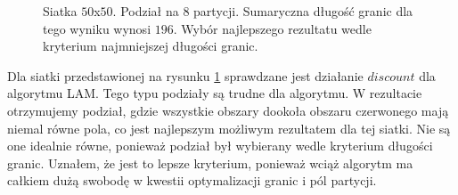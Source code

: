 \begin{figure}[h]
\begin{subfigure}{.33\textwidth}
    \caption[short]{}
\end{subfigure}
\caption{Siatka $50$x$50$. Podział na $8$ partycji. Sumaryczna długość granic dla tego wyniku wynosi $196$.
Wybór najlepszego rezultatu wedle kryterium najmniejszej długości granic.}
\label{result:5}
\end{figure}

Dla siatki przedstawionej na rysunku \ref{result:5} sprawdzane jest działanie $discount$ dla algorytmu LAM.
Tego typu podziały są trudne dla algorytmu.
W rezultacie otrzymujemy podział, gdzie wszystkie obszary dookoła obszaru czerwonego mają niemal równe pola, co jest
najlepszym możliwym rezultatem dla tej siatki.
Nie są one idealnie równe, ponieważ podział był wybierany wedle kryterium długości granic.
Uznałem, że jest to lepsze kryterium, ponieważ wciąż algorytm ma całkiem dużą swobodę w kwestii optymalizacji granic i
pól partycji.

